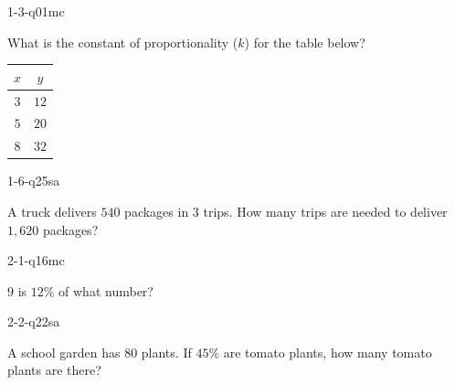 
\begin{practiceQuestion}{1-3-q01}{mc}
\begin{questionText}
What is the constant of proportionality ($k$) for the table below?

\begin{center}
\begin{tabular}{|c|c|}
\hline $x$ & $y$ \\ \hline $3$ & $12$ \\ $5$ & $20$ \\ $8$ & $32$ \\ \hline
\end{tabular}
\end{center}
\end{questionText}
\end{practiceQuestion}

\begin{practiceQuestion}{1-6-q25}{sa}
\begin{questionText}
A truck delivers $540$ packages in $3$ trips. How many trips are needed to deliver $1{,}620$ packages?
\end{questionText}
\end{practiceQuestion}

\begin{practiceQuestion}{2-1-q16}{mc}
\begin{questionText}
$9$ is $12\%$ of what number?
\end{questionText}
\end{practiceQuestion}

\begin{practiceQuestion}{2-2-q22}{sa}
\begin{questionText}
A school garden has $80$ plants. If $45\%$ are tomato plants, how many tomato plants are there?
\end{questionText}
\end{practiceQuestion}

